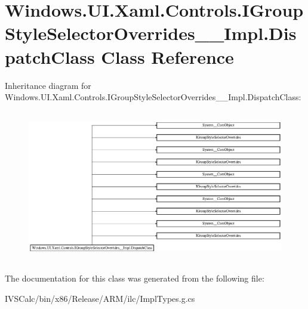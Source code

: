 \hypertarget{class_windows_1_1_u_i_1_1_xaml_1_1_controls_1_1_i_group_style_selector_overrides_____impl_1_1_dispatch_class}{}\section{Windows.\+U\+I.\+Xaml.\+Controls.\+I\+Group\+Style\+Selector\+Overrides\+\_\+\+\_\+\+Impl.\+Dispatch\+Class Class Reference}
\label{class_windows_1_1_u_i_1_1_xaml_1_1_controls_1_1_i_group_style_selector_overrides_____impl_1_1_dispatch_class}
Inheritance diagram for Windows.\+U\+I.\+Xaml.\+Controls.\+I\+Group\+Style\+Selector\+Overrides\+\_\+\+\_\+\+Impl.\+Dispatch\+Class\+:\begin{figure}[H]
\begin{center}
\leavevmode
\includegraphics[height=6.666667cm]{class_windows_1_1_u_i_1_1_xaml_1_1_controls_1_1_i_group_style_selector_overrides_____impl_1_1_dispatch_class}
\end{center}
\end{figure}


The documentation for this class was generated from the following file\+:\begin{DoxyCompactItemize}
\item 
I\+V\+S\+Calc/bin/x86/\+Release/\+A\+R\+M/ilc/Impl\+Types.\+g.\+cs\end{DoxyCompactItemize}
